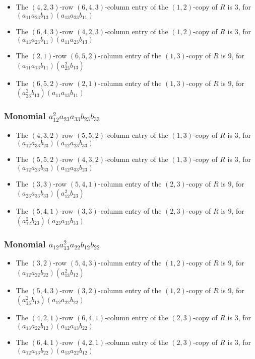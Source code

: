 \documentclass{article}
\begin{document}
\begin{itemize}
\item The $(4, 2, 3)$-row $(6, 4, 3)$-column entry of the $ \left(1, 2\right) $-copy of $R$ is $ 3 $, for $( a_{11} a_{23} b_{13} )( a_{13} a_{23} b_{11} )$ 
\item The $(6, 4, 3)$-row $(4, 2, 3)$-column entry of the $ \left(1, 2\right) $-copy of $R$ is $ 3 $, for $( a_{13} a_{23} b_{11} )( a_{11} a_{23} b_{13} )$ 
\item The $(2, 1)$-row $(6, 5, 2)$-column entry of the $ \left(1, 3\right) $-copy of $R$ is $ 9 $, for $( a_{11} a_{13} b_{11} )( a_{23}^{2} b_{13} )$ 
\item The $(6, 5, 2)$-row $(2, 1)$-column entry of the $ \left(1, 3\right) $-copy of $R$ is $ 9 $, for $( a_{23}^{2} b_{13} )( a_{11} a_{13} b_{11} )$ 
\end{itemize}
\subsubsection{Monomial $ a_{12}^{2} a_{23} a_{33} b_{23} b_{33} $}

\begin{itemize}
\item The $(4, 3, 2)$-row $(5, 5, 2)$-column entry of the $ \left(1, 3\right) $-copy of $R$ is $ 3 $, for $( a_{12} a_{33} b_{23} )( a_{12} a_{23} b_{33} )$ 
\item The $(5, 5, 2)$-row $(4, 3, 2)$-column entry of the $ \left(1, 3\right) $-copy of $R$ is $ 3 $, for $( a_{12} a_{23} b_{33} )( a_{12} a_{33} b_{23} )$ 
\item The $(3, 3)$-row $(5, 4, 1)$-column entry of the $ \left(2, 3\right) $-copy of $R$ is $ 9 $, for $( a_{23} a_{33} b_{33} )( a_{12}^{2} b_{23} )$ 
\item The $(5, 4, 1)$-row $(3, 3)$-column entry of the $ \left(2, 3\right) $-copy of $R$ is $ 9 $, for $( a_{12}^{2} b_{23} )( a_{23} a_{33} b_{33} )$ 
\end{itemize}
\subsubsection{Monomial $ a_{12} a_{13}^{2} a_{22} b_{12} b_{22} $}

\begin{itemize}
\item The $(3, 2)$-row $(5, 4, 3)$-column entry of the $ \left(1, 2\right) $-copy of $R$ is $ 9 $, for $( a_{12} a_{22} b_{22} )( a_{13}^{2} b_{12} )$ 
\item The $(5, 4, 3)$-row $(3, 2)$-column entry of the $ \left(1, 2\right) $-copy of $R$ is $ 9 $, for $( a_{13}^{2} b_{12} )( a_{12} a_{22} b_{22} )$ 
\item The $(4, 2, 1)$-row $(6, 4, 1)$-column entry of the $ \left(2, 3\right) $-copy of $R$ is $ 3 $, for $( a_{13} a_{22} b_{12} )( a_{12} a_{13} b_{22} )$ 
\item The $(6, 4, 1)$-row $(4, 2, 1)$-column entry of the $ \left(2, 3\right) $-copy of $R$ is $ 3 $, for $( a_{12} a_{13} b_{22} )( a_{13} a_{22} b_{12} )$ 
\end{itemize}
\end{document}

